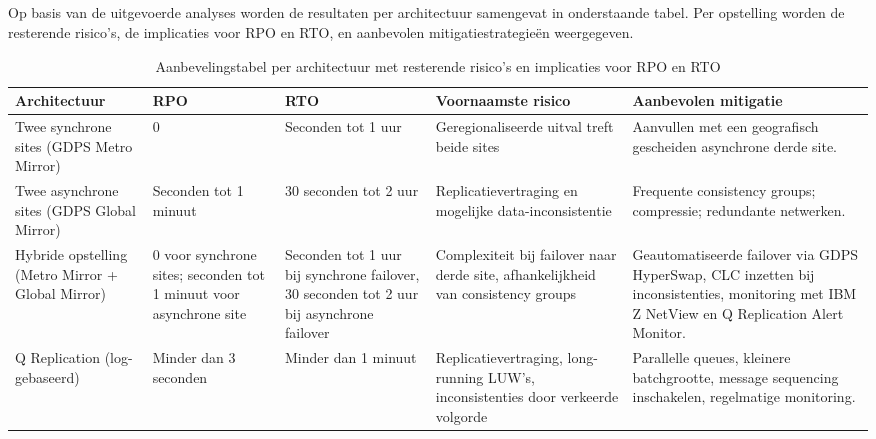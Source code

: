 \subsection{}%
\label{sec:aanbevelingstabel}

Op basis van de uitgevoerde analyses worden de resultaten per architectuur samengevat in onderstaande tabel.
Per opstelling worden de resterende risico's, de implicaties voor RPO en RTO, en aanbevolen mitigatiestrategieën weergegeven.

\begin{table}[h]
\centering
\begin{tabularx}{\textwidth}{|p{2cm}|p{2cm}|p{3cm}|p{3cm}|X|}
\hline
\textbf{Architect\-uur} & \textbf{RPO} & \textbf{RTO} & \textbf{Voornaamste risico} & \textbf{Aanbevolen mitigatie} \\
\hline
Twee synchrone sites (GDPS Metro Mirror) & 0 & Seconden tot 1 uur & Geregionali\-seer\-de uitval treft beide sites & Aanvullen met een geografisch gescheiden asynchrone derde site. \\
\hline
Twee asynchrone sites (GDPS Global Mirror) & Seconden tot 1 minuut & 30 seconden tot 2 uur & Replicatie\-vertraging en mogelijke data-inconsistentie & Frequente consistency groups; compressie; redundante netwerken. \\
\hline
Hybride opstelling (Metro Mirror + Global Mirror) & 0 voor synchrone sites; seconden tot 1 minuut voor asynchrone site & Seconden tot 1 uur bij synchrone failover, 30 seconden tot 2 uur bij asynchrone failover & Complexiteit bij failover naar derde site, afhankelijkheid van consistency groups & Geautomatiseerde failover via GDPS HyperSwap, CLC inzetten bij inconsistenties, monitoring met IBM Z NetView en Q Replication Alert Monitor. \\
\hline
Q Replication (log-gebaseerd) & Minder dan 3 seconden & Minder dan 1 minuut & Replicatie\-vertraging, long-running LUW's, inconsistenties door verkeerde volgorde & Parallelle queues, kleinere batchgrootte, message sequencing inschakelen, regelmatige monitoring. \\
\hline
\end{tabularx}
\caption{Aanbevelingstabel per architectuur met resterende risico's en implicaties voor RPO en RTO}
\label{tab:aanbevelingstabel}
\end{table}

\FloatBarrier

